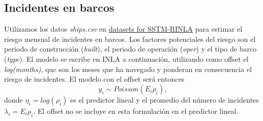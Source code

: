 \documentclass[
]{book}
\newenvironment{Shaded}{\begin{snugshade}}{\end{snugshade}}
\newcommand{\AttributeTok}[1]{\textcolor[rgb]{0.77,0.63,0.00}{#1}}
\newcommand{\CommentTok}[1]{\textcolor[rgb]{0.56,0.35,0.01}{\textit{#1}}}
\newcommand{\DecValTok}[1]{\textcolor[rgb]{0.00,0.00,0.81}{#1}}
\newcommand{\FunctionTok}[1]{\textcolor[rgb]{0.00,0.00,0.00}{#1}}
\newcommand{\NormalTok}[1]{#1}
\newcommand{\OtherTok}[1]{\textcolor[rgb]{0.56,0.35,0.01}{#1}}
\newcommand{\SpecialCharTok}[1]{\textcolor[rgb]{0.00,0.00,0.00}{#1}}
\newcommand{\StringTok}[1]{\textcolor[rgb]{0.31,0.60,0.02}{#1}}
\begin{document}
\hypertarget{incidentes-en-barcos}{%
\subsection{Incidentes en barcos}\label{incidentes-en-barcos}}

Utilizamos los datos \emph{ships.csv} en \href{https://sites.google.com/a/r-inla.org/stbook/datasets}{datasets for SSTM-RINLA} para estimar el riesgo mensual de incidentes en barcos. Los factores potenciales del riesgo son el periodo de construcción (\emph{built}), el periodo de operación (\emph{oper}) y el tipo de barco (\emph{type}).
El modelo se escribe en INLA a continuación, utilizando como offset el \emph{log(months)}, que son los meses que ha navegado y ponderan en consecuencia el riesgo de incidentes. El modelo con el offset será entonces
\[y_i \sim Poisson (E_i \rho_i),\]
donde \(\eta_i=log(\rho_i)\) es el predictor lineal y el promedio del número de incidentes \(\lambda_i=E_i \rho_i\). El offset no se incluye en esta formulación en el predictor lineal.

\begin{Shaded}
\end{Shaded}
\end{document}

